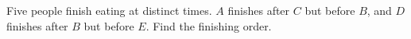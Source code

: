 Five people finish eating at distinct times. $A$ finishes after $C$ but before $B$, and $D$ finishes after $B$ but before $E$. Find the finishing order.
